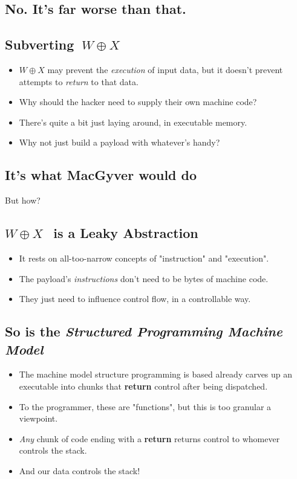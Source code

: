 \documentclass[11pt]{article}
\begin{document}
\subsection*{No. It's far worse than that.}
\label{sec:orgc53d760}
\subsection*{Subverting \(~W\oplus X\)}
\label{sec:org5a2b1b7}
\begin{itemize}
\item \(W\oplus X\) may prevent the \emph{execution} of input data, but it doesn't prevent attempts to \emph{return} to that data.
\item Why should the hacker need to supply their own machine code?
\item There's quite a bit just laying around, in executable memory.
\item Why not just build a payload with whatever's handy?
\end{itemize}
\subsection*{It's what MacGyver would do}
\label{sec:org076f91b}
But how?
\subsection*{\(W\oplus X~~\) is a Leaky Abstraction}
\label{sec:orgca04221}
\begin{itemize}
\item It rests on all-too-narrow concepts of "instruction" and "execution".
\item The payload's \emph{instructions} don't need to be bytes of machine code.
\item They just need to influence control flow, in a controllable way.
\end{itemize}
\subsection*{So is the \emph{Structured Programming Machine Model}}
\label{sec:org17e79b0}
\begin{itemize}
\item The machine model structure programming is based already carves up an executable into chunks that \textbf{return} control after being dispatched.
\item To the programmer, these are "functions", but this is too granular a viewpoint.
\item \emph{Any} chunk of code ending with a \textbf{return} returns control to whomever controls the stack.
\item And our data controls the stack!
\end{itemize}
\end{document}
